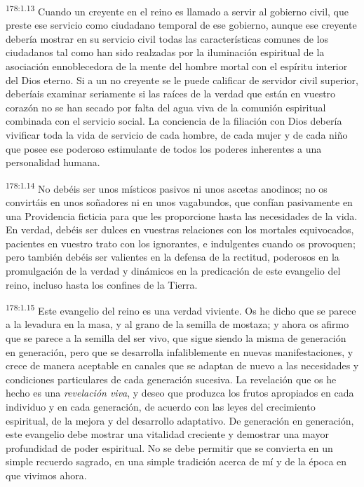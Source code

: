\par 
\textsuperscript{178:1.13} Cuando un creyente en el reino es llamado a servir al gobierno civil, que preste ese servicio como ciudadano temporal de ese gobierno, aunque ese creyente debería mostrar en su servicio civil todas las características comunes de los ciudadanos tal como han sido realzadas por la iluminación espiritual de la asociación ennoblecedora de la mente del hombre mortal con el espíritu interior del Dios eterno. Si a un no creyente se le puede calificar de servidor civil superior, deberíais examinar seriamente si las raíces de la verdad que están en vuestro corazón no se han secado por falta del agua viva de la comunión espiritual combinada con el servicio social. La conciencia de la filiación con Dios debería vivificar toda la vida de servicio de cada hombre, de cada mujer y de cada niño que posee ese poderoso estimulante de todos los poderes inherentes a una personalidad humana.

\par 
\textsuperscript{178:1.14} No debéis ser unos místicos pasivos ni unos ascetas anodinos; no os convirtáis en unos soñadores ni en unos vagabundos, que confían pasivamente en una Providencia ficticia para que les proporcione hasta las necesidades de la vida. En verdad, debéis ser dulces en vuestras relaciones con los mortales equivocados, pacientes en vuestro trato con los ignorantes, e indulgentes cuando os provoquen; pero también debéis ser valientes en la defensa de la rectitud, poderosos en la promulgación de la verdad y dinámicos en la predicación de este evangelio del reino, incluso hasta los confines de la Tierra.

\par 
\textsuperscript{178:1.15} Este evangelio del reino es una verdad viviente. Os he dicho que se parece a la levadura en la masa, y al grano de la semilla de mostaza; y ahora os afirmo que se parece a la semilla del ser vivo, que sigue siendo la misma de generación en generación, pero que se desarrolla infaliblemente en nuevas manifestaciones, y crece de manera aceptable en canales que se adaptan de nuevo a las necesidades y condiciones particulares de cada generación sucesiva. La revelación que os he hecho es una \textit{revelación viva}, y deseo que produzca los frutos apropiados en cada individuo y en cada generación, de acuerdo con las leyes del crecimiento espiritual, de la mejora y del desarrollo adaptativo. De generación en generación, este evangelio debe mostrar una vitalidad creciente y demostrar una mayor profundidad de poder espiritual. No se debe permitir que se convierta en un simple recuerdo sagrado, en una simple tradición acerca de mí y de la época en que vivimos ahora.

